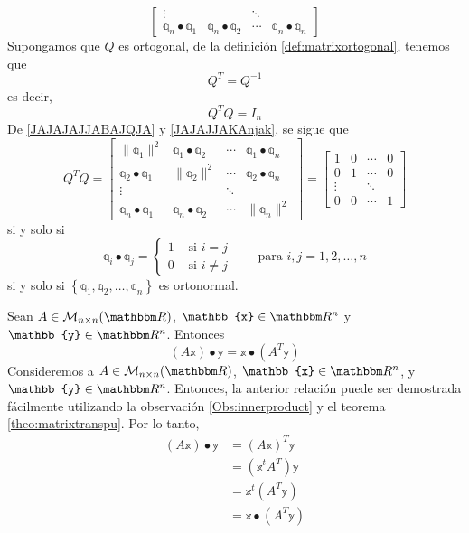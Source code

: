 \begin{theorem}
\begin{equation}
\begin{bmatrix}
            \vdots & & \ddots & \\
            \mathbb{q}_n \bullet \mathbb{q}_1 & \mathbb{q}_n \bullet \mathbb{q}_2 & \cdots & \mathbb{q}_n \bullet \mathbb{q}_n
        \end{bmatrix} \label{JAJAJAJJABAJQJA}
    \end{equation}
    Supongamos que $Q$ es ortogonal, de la definición \ref{def:matrixortogonal}, tenemos que
    $$Q^T = Q^{-1}$$
    es decir,
    \begin{equation}
        Q^T Q = I_n \label{JAJAJJAKAnjak}
    \end{equation}
    De \eqref{JAJAJAJJABAJQJA} y \eqref{JAJAJJAKAnjak}, se sigue que
    $$Q^TQ = \begin{bmatrix}
        \| \mathbb{q}_1 \|^2 & \mathbb{q}_1 \bullet \mathbb{q}_2 & \cdots & \mathbb{q}_1 \bullet \mathbb{q}_n \\
        \mathbb{q}_2 \bullet \mathbb{q}_1 & \| \mathbb{q}_2 \|^2 & \cdots & \mathbb{q}_2 \bullet \mathbb{q}_n \\
        \vdots & & \ddots & \\
        \mathbb{q}_n \bullet \mathbb{q}_1 & \mathbb{q}_n \bullet \mathbb{q}_2 & \cdots & \| \mathbb{q}_n \|^2
    \end{bmatrix} = \begin{bmatrix}
        1 & 0 & \cdots & 0 \\
        0 & 1 & \cdots & 0 \\
        \vdots & & \ddots & \\
        0 & 0 & \cdots & 1
    \end{bmatrix}$$
    si y solo si
    $$\mathbb{q}_i \bullet \mathbb{q}_j = \begin{cases}
        1 & \text{ si } i = j \\
        0 & \text{ si } i \neq j
    \end{cases} \qquad \text{para } i, j = 1, 2, \dots, n$$
    si y solo si $\left\{ \mathbb{q}_1, \mathbb{q}_2, \dots, \mathbb{q}_n \right\}$ es ortonormal.
\end{theorem}

\begin{theorem}
    Sean $A \in \mathcal{M}_{n \times n}(\RR)$, $\mathbb{x} \in \RR[n]$ y $\mathbb{y} \in \RR[n]$. Entonces
    $$(A \mathbb{x}) \bullet \mathbb{y} = \mathbb{x} \bullet \left(A^T \mathbb{y}\right)$$
    \demostracion Consideremos a \( A \in \mathcal{M}_{n \times n}(\RR) \), \( \mathbb{x} \in \RR[n] \), y \( \mathbb{y} \in \RR[n] \). Entonces, la anterior relación puede ser demostrada fácilmente utilizando la observación \ref{Obs:innerproduct} y el teorema \ref{theo:matrixtranspu}. Por lo tanto,
    \begin{align*}
        (A\mathbb{x}) \bullet \mathbb{y} & = (A\mathbb{x})^T \mathbb{y} \\
        & = \left( \mathbb{x}^t A^T \right) \mathbb{y} \\
        & = \mathbb{x}^t \left(A^T \mathbb{y} \right) \\
        & = \mathbb{x} \bullet \left( A^T \mathbb{y} \right)
    \end{align*}
\end{theorem}


